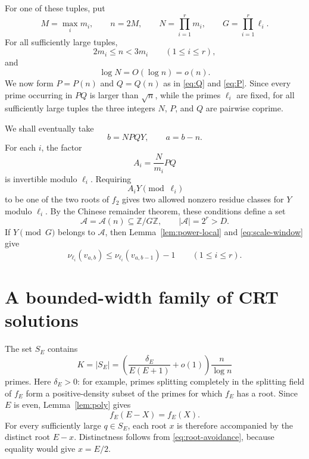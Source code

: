 \documentclass[11pt]{article}
\newcommand{\Z}{\mathbb Z}
\begin{document}
For one of these tuples, put
\begin{equation}\label{eq:n-N}
  M=\max_i m_i,
  \qquad
  n=2M,
  \qquad
  N=\prod_{i=1}^{r}m_i,
  \qquad
  G=\prod_{i=1}^{r}\ell_i.
\end{equation}
For all sufficiently large tuples,
\begin{equation}\label{eq:scale-window}
  2m_i\leq n<3m_i
  \qquad(1\leq i\leq r),
\end{equation}
and
\begin{equation}\label{eq:N-small}
  \log N=O(\log n)=o(n).
\end{equation}
We now form $P=P(n)$ and $Q=Q(n)$ as in \eqref{eq:Q} and \eqref{eq:P}. Since every prime occurring in $P Q$ is larger than $\sqrt n$, while the primes $\ell_i$ are fixed, for all sufficiently large tuples the three integers $N$, $P$, and $Q$ are pairwise coprime.

We shall eventually take
\begin{equation}\label{eq:b-form}
  b=NPQY,
  \qquad
  a=b-n.
\end{equation}
For each $i$, the factor
\[
  A_i=\frac{N}{m_i}PQ
\]
is invertible modulo $\ell_i$. Requiring
\[
  A_iY\pmod{\ell_i}
\]
to be one of the two roots of $f_2$ gives two allowed nonzero residue classes for $Y$ modulo $\ell_i$. By the Chinese remainder theorem, these conditions define a set
\begin{equation}\label{eq:A-set}
  \mathcal A=\mathcal A(n)\subseteq\Z/G\Z,
  \qquad
  |\mathcal A|=2^r>D.
\end{equation}
If $Y\pmod G$ belongs to $\mathcal A$, then Lemma~\ref{lem:power-local} and \eqref{eq:scale-window} give
\begin{equation}\label{eq:aux-drop}
  \nu_{\ell_i}(v_{a,b})
  \leq\nu_{\ell_i}(v_{a,b-1})-1
  \qquad(1\leq i\leq r).
\end{equation}

\section{A bounded-width family of CRT solutions}

The set $S_E$ contains
\begin{equation}\label{eq:reservoir-size}
  K=|S_E|
  =\left(\frac{\delta_E}{E(E+1)}+o(1)\right)\frac n{\log n}
\end{equation}
primes. Here $\delta_E>0$: for example, primes splitting completely in the splitting field of $f_E$ form a positive-density subset of the primes for which $f_E$ has a root. Since $E$ is even, Lemma~\ref{lem:poly} gives
\[
  f_E(E-X)=f_E(X).
\]
For every sufficiently large $q\in S_E$, each root $x$ is therefore accompanied by the distinct root $E-x$. Distinctness follows from \eqref{eq:root-avoidance}, because equality would give $x=E/2$.
\end{document}

